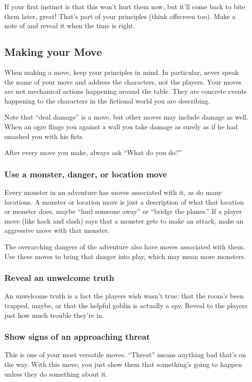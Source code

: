  If your first instinct is that this won't hurt them now, but it'll come back to bite them later, great! That's part of your principles (think offscreen too). Make a note of and reveal it when the time is right.
\subsection{Making your Move}


 When making a move, keep your principles in mind. In particular, never speak the name of your move and address the characters, not the players. Your moves are not mechanical actions happening around the table. They are concrete events happening to the characters in the fictional world you are describing.


 Note that ``deal damage'' is a move, but other moves may include damage as well. When an ogre flings you against a wall you take damage as surely as if he had smashed you with his fists.


 After every move you make, always ask ``What do you do?''
\subsubsection{Use a monster, danger, or location move}


 Every monster in an adventure has moves associated with it, as do many locations. A monster or location move is just a description of what that location or monster does, maybe ``hurl someone away'' or ``bridge the planes.'' If a player move (like hack and slash) says that a monster gets to make an attack, make an aggressive move with that monster.


 The overarching dangers of the adventure also have moves associated with them. Use these moves to bring that danger into play, which may mean more monsters.
\subsubsection{Reveal an unwelcome truth}


 An unwelcome truth is a fact the players wish wasn't true: that the room's been trapped, maybe, or that the helpful goblin is actually a spy. Reveal to the players just how much trouble they're in.
\subsubsection{Show signs of an approaching threat}


 This is one of your most versatile moves. ``Threat'' means anything bad that's on the way. With this move, you just show them that something's going to happen unless they do something about it.
